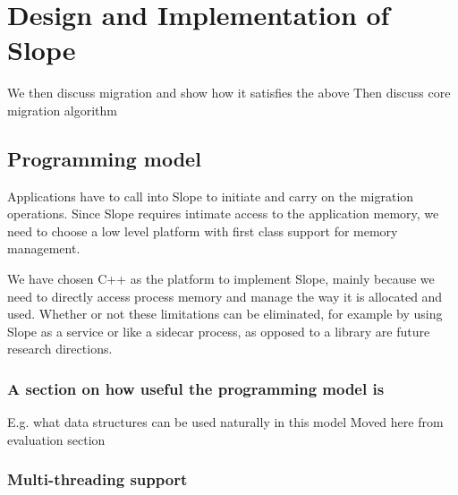 \chapter{Design and Implementation of Slope}
\label{chap:design}

We then discuss migration and show how it satisfies the above
Then discuss core migration algorithm

\section{Programming model}
\label{sec:platform}


Applications have to call into Slope to \CHECK{} initiate and carry on the
migration operations. Since Slope requires intimate access to the application
memory, we need to choose a low level platform with first class support for
memory management.

We have chosen C++ as the platform to implement Slope, mainly because we need
to directly access process memory and manage the way it is allocated and used.
Whether or not these limitations can be eliminated, for example by using Slope
as a service or like a sidecar process, as opposed to a library are future
research directions.

\subsection{A section on how useful the programming model is}
E.g. what data structures can be used naturally in this model
Moved here from evaluation section
\subsection{Multi-threading support}


